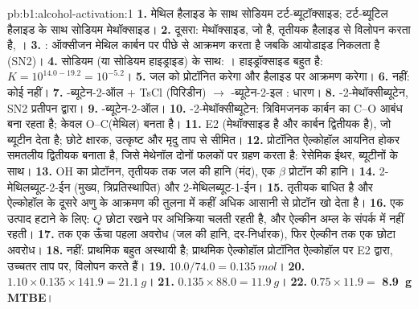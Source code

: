 \begin{solution}{pb:b1:alcohol-activation:1}
\textbf{1.} मेथिल हैलाइड के साथ सोडियम टर्ट-ब्यूटॉक्साइड; टर्ट-ब्यूटिल हैलाइड के साथ
सोडियम मेथॉक्साइड।
\textbf{2.} दूसरा: मेथॉक्साइड, जो  है, तृतीयक हैलाइड से
विलोपन करता है, ।
\textbf{3.} :  ऑक्सीजन
मेथिल कार्बन पर पीछे से आक्रमण करता है जबकि आयोडाइड निकलता है (SN2)।
\textbf{4.} सोडियम (या सोडियम हाइड्राइड) के साथ: । हाइड्रॉक्साइड बहुत  है: $K = 10^{14.0 -
19.2} = 10^{-5.2}$।
\textbf{5.} जल  को प्रोटॉनित करेगा और हैलाइड पर आक्रमण करेगा।
\textbf{6.} नहीं: कोई  नहीं।
\textbf{7.} -ब्यूटेन-2-ऑल + TsCl (पिरिडीन) $\to$ -ब्यूटेन-2-इल
: धारण।
\textbf{8.} -2-मेथॉक्सीब्यूटेन, SN2 प्रतीपन द्वारा।
\textbf{9.} -ब्यूटेन-2-ऑल।
\textbf{10.} -2-मेथॉक्सीब्यूटेन: त्रिविमजनक कार्बन का C--O आबंध
बना रहता है; केवल O--C(मेथिल) बनता है।
\textbf{11.} E2 (मेथॉक्साइड  है और कार्बन द्वितीयक है),
जो ब्यूटीन देता है; छोटे क्षारक, उत्कृष्ट  और
मृदु ताप से सीमित।
\textbf{12.} प्रोटॉनित ऐल्कोहॉल आयनित होकर समतलीय द्वितीयक
 बनाता है, जिसे मेथेनॉल दोनों फलकों पर ग्रहण करता है: रेसेमिक ईथर,
ब्यूटीनों के साथ।
\textbf{13.} OH का प्रोटॉनन, तृतीयक  तक जल की हानि (मंद),
एक $\beta$ प्रोटॉन की हानि।
\textbf{14.} 2-मेथिलब्यूट-2-ईन (मुख्य, त्रिप्रतिस्थापित) और
2-मेथिलब्यूट-1-ईन।
\textbf{15.} तृतीयक  बाधित है और ऐल्कोहॉल के दूसरे अणु के आक्रमण की
तुलना में कहीं अधिक आसानी से प्रोटॉन खो देता है।
\textbf{16.} एक उत्पाद हटाने के लिए: $Q$ छोटा रखने पर अभिक्रिया चलती रहती है,
और ऐल्कीन अम्ल के संपर्क में नहीं रहती।
\textbf{17.}  तक एक ऊँचा पहला अवरोध (जल की हानि, दर-निर्धारक),
फिर ऐल्कीन तक एक छोटा अवरोध।
\textbf{18.} नहीं: प्राथमिक  बहुत अस्थायी है; प्राथमिक ऐल्कोहॉल
प्रोटॉनित ऐल्कोहॉल पर E2 द्वारा, उच्चतर ताप पर, विलोपन करते हैं।
\textbf{19.} $10.0/74.0 = \qty{0.135}{mol}$।
\textbf{20.} $1.10 \times 0.135 \times 141.9 = \qty{21.1}{g}$।
\textbf{21.} $0.135 \times 88.0 = \qty{11.9}{g}$।
\textbf{22.} $0.75 \times 11.9 =$ \textbf{\qty{8.9}{g} MTBE}।
\end{solution}
